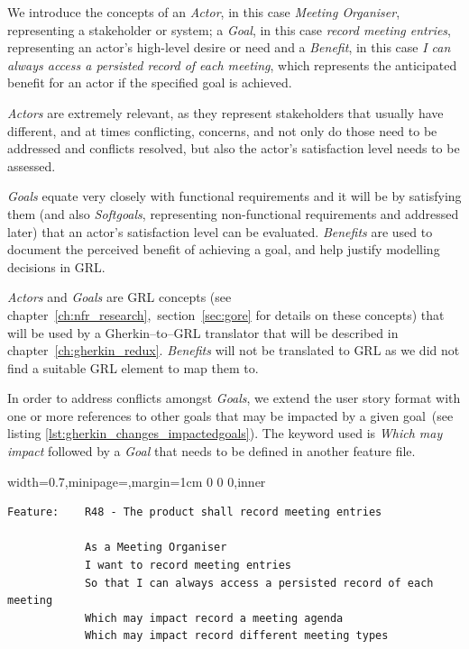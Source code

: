 \documentclass[dissertation,final]{softeng}
\newenvironment{featurecode}[1]
{ \lrbox\featurebox \begin{adjustbox}{width=#1\textwidth,minipage=\textwidth,margin=1cm 0 0 0,inner} }
{ \end{adjustbox}\endlrbox}
\newenvironment{featurelist}[2]
{
\newcommand{\setcaption}{\caption{#1}}
\newcommand{\setlabel}{\label{#2}}
}
{\begin{listing}[h!]\centering\usebox\featurebox\setcaption\setlabel\end{listing}}
\begin{document}
We introduce the concepts of an \emph{Actor}, in this case \emph{Meeting Organiser}, representing a stakeholder or system; a \emph{Goal}, in this case \emph{record meeting entries}, representing an actor's high-level desire or need and a \emph{Benefit}, in this case \emph{I can always access a persisted record of each meeting}, which represents the anticipated benefit for an actor if the specified goal is achieved.

\emph{Actors} are extremely relevant, as they represent stakeholders that usually have different, and at times conflicting, concerns, and not only do those need to be addressed and conflicts resolved, but also the actor's satisfaction level needs to be assessed.

\emph{Goals} equate very closely with functional requirements and it will be by satisfying them (and also \emph{Softgoals}, representing non-functional requirements and addressed later) that an actor's satisfaction level can be evaluated. \emph{Benefits} are used to document the perceived benefit of achieving a goal, and help justify modelling decisions in GRL.

\emph{Actors} and \emph{Goals} are GRL concepts (see chapter~\ref{ch:nfr_research},~section~\ref{sec:gore} for details on these concepts) that will be used by a Gherkin--to--GRL translator that will be described in chapter~\ref{ch:gherkin_redux}. \emph{Benefits} will not be translated to GRL as we did not find a suitable GRL element to map them to.

In order to address conflicts amongst \emph{Goals}, we extend the user story format with one or more references to other goals that may be impacted by a given goal~(see listing \ref{lst:gherkin_changes_impactedgoals}). The keyword used is \emph{Which may impact} followed by a \emph{Goal} that needs to be defined in another feature file.

\begin{featurelist}{Changes to Gherkin -- Impacted goals}{lst:gherkin_changes_impactedgoals}
\begin{featurecode}{0.7}
\begin{verbatim}
Feature:    R48 - The product shall record meeting entries

            As a Meeting Organiser
            I want to record meeting entries
            So that I can always access a persisted record of each meeting
            Which may impact record a meeting agenda
            Which may impact record different meeting types

\end{verbatim}
\end{featurecode}
\end{featurelist}
\end{document}
